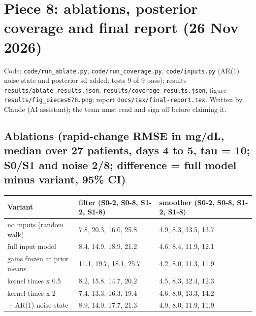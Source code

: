 \documentclass[11pt,a4paper]{article}
\begin{document}
\hypertarget{piece-8-ablations-posterior-coverage-and-final-report-26-nov-2026}{%
\section{Piece 8: ablations, posterior coverage and final report (26 Nov
2026)}\label{piece-8-ablations-posterior-coverage-and-final-report-26-nov-2026}}

Code: \texttt{code/run\_ablate.py}, \texttt{code/run\_coverage.py},
\texttt{code/inputs.py} (AR(1) noise state and posterior sd added; tests
9 of 9 pass); results \texttt{results/ablate\_results.json},
\texttt{results/coverage\_results.json}, figure
\texttt{results/fig\_pieces678.png}; report
\texttt{docs/tex/final-report.tex}. Written by Claude (AI assistant);
the team must read and sign off before claiming it.

\hypertarget{ablations-rapid-change-rmse-in-mgdl-median-over-27-patients-days-4-to-5-tau--10-s0s1-and-noise-28-difference--full-model-minus-variant-95-ci}{%
\subsection{Ablations (rapid-change RMSE in mg/dL, median over 27
patients, days 4 to 5, tau = 10; S0/S1 and noise 2/8; difference = full
model minus variant, 95\%
CI)}\label{ablations-rapid-change-rmse-in-mgdl-median-over-27-patients-days-4-to-5-tau--10-s0s1-and-noise-28-difference--full-model-minus-variant-95-ci}}

\begin{longtable}[]{@{}lll@{}}
\toprule\noalign{}
Variant & filter (S0-2, S0-8, S1-2, S1-8) & smoother (S0-2, S0-8, S1-2,
S1-8) \\
\midrule\noalign{}
\endhead
\bottomrule\noalign{}
\endlastfoot
no inputs (random walk) & 7.8, 20.3, 16.0, 25.8 & 4.9, 8.3, 13.5,
13.7 \\
full input model & 8.4, 14.9, 18.9, 21.2 & 4.6, 8.4, 11.9, 12.1 \\
gains frozen at prior means & 11.1, 19.7, 18.1, 25.7 & 4.2, 8.0, 11.3,
11.9 \\
kernel times x 0.5 & 8.2, 15.8, 14.7, 20.2 & 4.5, 8.3, 12.4, 12.3 \\
kernel times x 2 & 7.4, 13.3, 16.3, 19.4 & 4.6, 8.0, 13.3, 14.2 \\
+ AR(1) noise state & 8.9, 14.0, 17.7, 21.3 & 4.9, 8.0, 11.9, 11.9 \\
\end{longtable}
\end{document}
